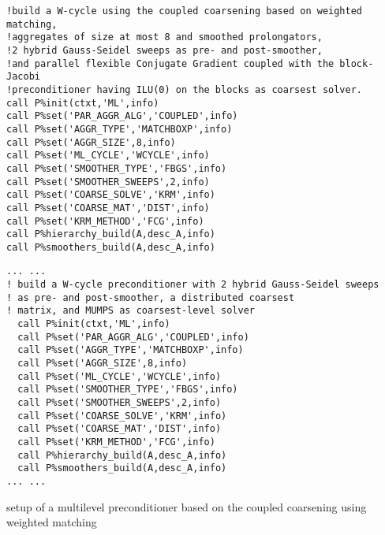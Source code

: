 \begin{listing}[h!]
\ifpdf
\begin{verbatim}
!build a W-cycle using the coupled coarsening based on weighted matching, 
!aggregates of size at most 8 and smoothed prolongators,
!2 hybrid Gauss-Seidel sweeps as pre- and post-smoother,
!and parallel flexible Conjugate Gradient coupled with the block-Jacobi 
!preconditioner having ILU(0) on the blocks as coarsest solver. 
call P%init(ctxt,'ML',info)
call P%set('PAR_AGGR_ALG','COUPLED',info)
call P%set('AGGR_TYPE','MATCHBOXP',info)
call P%set('AGGR_SIZE',8,info)
call P%set('ML_CYCLE','WCYCLE',info)
call P%set('SMOOTHER_TYPE','FBGS',info)
call P%set('SMOOTHER_SWEEPS',2,info)
call P%set('COARSE_SOLVE','KRM',info)
call P%set('COARSE_MAT','DIST',info)
call P%set('KRM_METHOD','FCG',info)
call P%hierarchy_build(A,desc_A,info)
call P%smoothers_build(A,desc_A,info)
\end{verbatim}
\else
\begin{center}
\begin{minipage}{.90\textwidth}
{\small
\begin{verbatim}
... ...
! build a W-cycle preconditioner with 2 hybrid Gauss-Seidel sweeps
! as pre- and post-smoother, a distributed coarsest
! matrix, and MUMPS as coarsest-level solver
  call P%init(ctxt,'ML',info)
  call P%set('PAR_AGGR_ALG','COUPLED',info)
  call P%set('AGGR_TYPE','MATCHBOXP',info)
  call P%set('AGGR_SIZE',8,info)
  call P%set('ML_CYCLE','WCYCLE',info)
  call P%set('SMOOTHER_TYPE','FBGS',info)
  call P%set('SMOOTHER_SWEEPS',2,info)
  call P%set('COARSE_SOLVE','KRM',info)
  call P%set('COARSE_MAT','DIST',info)
  call P%set('KRM_METHOD','FCG',info)
  call P%hierarchy_build(A,desc_A,info)
  call P%smoothers_build(A,desc_A,info)
... ...
\end{verbatim}
}
\end{minipage}
\end{center}
\fi\vspace{-2em}%
\caption{setup of a multilevel preconditioner based on the coupled coarsening using weighted matching\label{fig:ex3}}
\end{listing}\vspace*{-2em}
